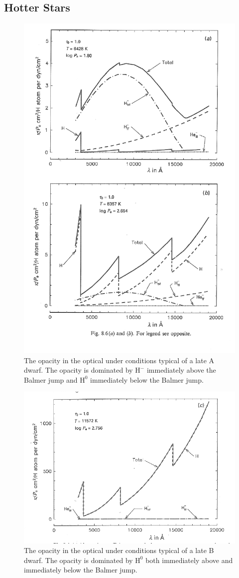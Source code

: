 \newslide

\subsection{Hotter Stars}



\begin{figure}
\centering
\includegraphics[width=0.7\linewidth]{figures/opacity-b.pdf}
\caption{The opacity in the optical under conditions typical of a late A dwarf. The opacity is dominated by $\mathrm{H}^-$ immediately above the Balmer jump and $\mathrm{H}^0$ immediately below the Balmer jump.}
\end{figure}

\begin{figure}
\centering
\includegraphics[width=0.7\linewidth]{figures/opacity-c.pdf}
\caption{The opacity in the optical under conditions typical of a late B dwarf. The opacity is dominated by $\mathrm{H}^0$ both immediately above and immediately below the Balmer jump.}
\end{figure}

